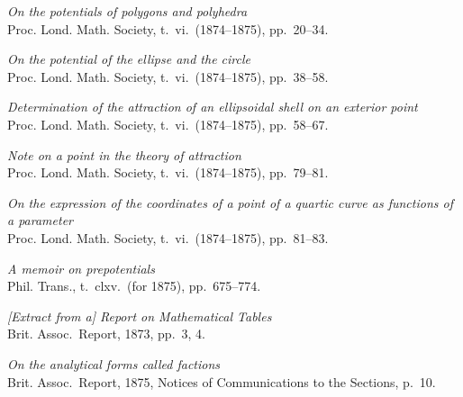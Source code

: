 \documentclass[11pt]{article}
\begin{document}
\begin{description}\itemsep=2pt
\item[602.] \textit{On the potentials of polygons and polyhedra}\\
\hspace*{1em}\small Proc. Lond. Math. Society, t.~vi.\ (1874--1875), pp.~20--34.

\item[603.] \textit{On the potential of the ellipse and the circle}\\
\hspace*{1em}\small Proc. Lond. Math. Society, t.~vi.\ (1874--1875), pp.~38--58.

\item[604.] \textit{Determination of the attraction of an ellipsoidal shell on an exterior point}\\
\hspace*{1em}\small Proc. Lond. Math. Society, t.~vi.\ (1874--1875), pp.~58--67.

\item[605.] \textit{Note on a point in the theory of attraction}\\
\hspace*{1em}\small Proc. Lond. Math. Society, t.~vi.\ (1874--1875), pp.~79--81.

\item[606.] \textit{On the expression of the coordinates of a point of a quartic curve as functions of a parameter}\\
\hspace*{1em}\small Proc. Lond. Math. Society, t.~vi.\ (1874--1875), pp.~81--83.

\item[607.] \textit{A memoir on prepotentials}\\
\hspace*{1em}\small Phil. Trans., t.~clxv.\ (for 1875), pp.~675--774.

\item[608.] \textit{[Extract from a] Report on Mathematical Tables}\\
\hspace*{1em}\small Brit. Assoc.\ Report, 1873, pp.~3, 4.

\item[609.] \textit{On the analytical forms called factions}\\
\hspace*{1em}\small Brit. Assoc.\ Report, 1875, Notices of Communications to the Sections, p.~10.


\end{description}
\end{document}
